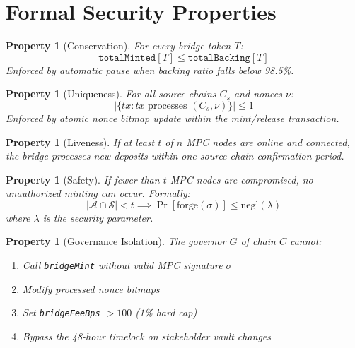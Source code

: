 \documentclass[11pt,twocolumn]{article}
\newtheorem{property}[theorem]{Property}
\begin{document}
\section{Formal Security Properties}

\begin{property}[Conservation]
For every bridge token $T$:
\begin{equation}
  \texttt{totalMinted}[T] \leq \texttt{totalBacking}[T]
\end{equation}
Enforced by automatic pause when backing ratio falls below 98.5\%.
\end{property}

\begin{property}[Uniqueness]
For all source chains $C_s$ and nonces $\nu$:
\begin{equation}
  |\{tx : tx \text{ processes } (C_s, \nu)\}| \leq 1
\end{equation}
Enforced by atomic nonce bitmap update within the mint/release transaction.
\end{property}

\begin{property}[Liveness]
If at least $t$ of $n$ MPC nodes are online and connected, the bridge processes new deposits within one source-chain confirmation period.
\end{property}

\begin{property}[Safety]
If fewer than $t$ MPC nodes are compromised, no unauthorized minting can occur. Formally:
\begin{equation}
  |\mathcal{A} \cap \mathcal{S}| < t \implies \Pr[\text{forge}(\sigma)] \leq \text{negl}(\lambda)
\end{equation}
where $\lambda$ is the security parameter.
\end{property}

\begin{property}[Governance Isolation]
The governor $G$ of chain $C$ cannot:
\begin{enumerate}[nosep]
  \item Call \texttt{bridgeMint} without valid MPC signature $\sigma$
  \item Modify processed nonce bitmaps
  \item Set \texttt{bridgeFeeBps} $> 100$ (1\% hard cap)
  \item Bypass the 48-hour timelock on stakeholder vault changes
\end{enumerate}
\end{property}
\end{document}
